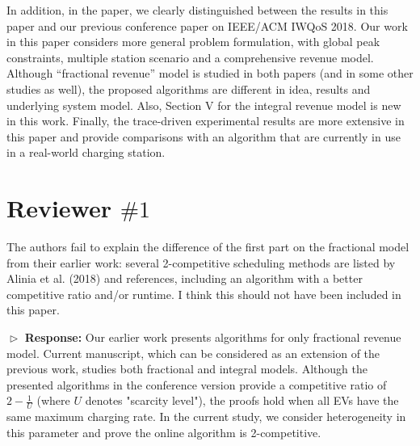 \documentclass[11pt]{article}
\newcommand{\bt}[1]{{\color{black}#1}}%
\newcommand{\bt}[1]{#1}
\begin{document}
In addition, in the paper, we clearly distinguished between the results in this paper and our previous conference paper on IEEE/ACM IWQoS 2018. Our work in this paper considers more general problem formulation, with global peak constraints, multiple station scenario and a comprehensive revenue model. \bt{Although  ``fractional revenue'' model is studied in both papers (and in some other studies as well), the proposed algorithms are  different in idea, results and underlying system model. Also, Section V for the integral revenue model is new in this work. Finally, the trace-driven experimental results are more extensive in this paper and provide comparisons with an algorithm that are currently in use in a real-world charging station. }




\newpage
\section{Reviewer $\# 1$}

{\color{blue} The authors fail to explain the difference of the first part on the fractional model from their earlier work: several 2-competitive scheduling methods are listed by Alinia et al. (2018) and references, including an algorithm with a better competitive ratio and/or runtime. I think this should not have been included in this paper. }
\vspace{3mm}

$\vartriangleright$ \noindent\textbf{Response:} 
Our earlier work presents algorithms for only fractional revenue model. Current manuscript, which can be considered as an extension of the previous work, studies both fractional and integral models. Although the presented algorithms in the conference version provide a competitive ratio of $2-\frac{1}{U}$ (where $U$ denotes "scarcity level"), the proofs hold when all EVs have the same maximum charging rate. In the current study, we consider heterogeneity in this parameter and prove the online algorithm is 2-competitive.
\end{document}
